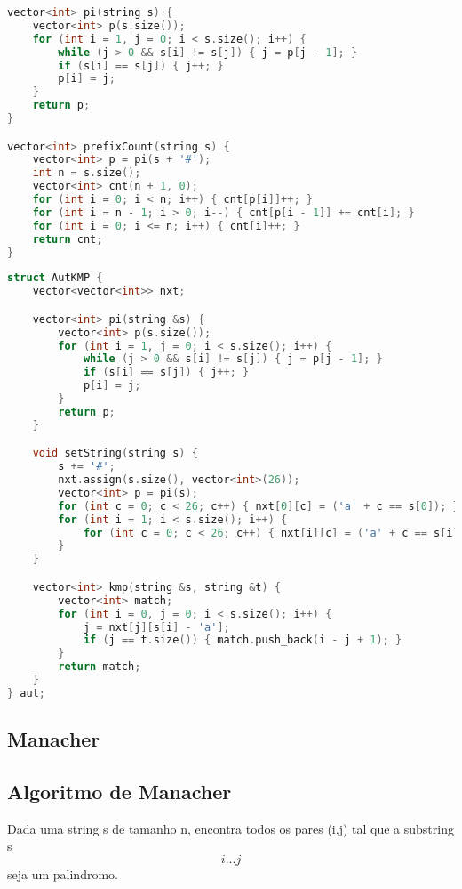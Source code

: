 \documentclass[11pt, a4paper, twoside]{article}
\begin{document}
\begin{lstlisting}[language=C++]
vector<int> pi(string s) {
    vector<int> p(s.size());
    for (int i = 1, j = 0; i < s.size(); i++) {
        while (j > 0 && s[i] != s[j]) { j = p[j - 1]; }
        if (s[i] == s[j]) { j++; }
        p[i] = j;
    }
    return p;
}

vector<int> prefixCount(string s) {
    vector<int> p = pi(s + '#');
    int n = s.size();
    vector<int> cnt(n + 1, 0);
    for (int i = 0; i < n; i++) { cnt[p[i]]++; }
    for (int i = n - 1; i > 0; i--) { cnt[p[i - 1]] += cnt[i]; }
    for (int i = 0; i <= n; i++) { cnt[i]++; }
    return cnt;
}\end{lstlisting}

\begin{lstlisting}[language=C++]
struct AutKMP {
    vector<vector<int>> nxt;

    vector<int> pi(string &s) {
        vector<int> p(s.size());
        for (int i = 1, j = 0; i < s.size(); i++) {
            while (j > 0 && s[i] != s[j]) { j = p[j - 1]; }
            if (s[i] == s[j]) { j++; }
            p[i] = j;
        }
        return p;
    }

    void setString(string s) {
        s += '#';
        nxt.assign(s.size(), vector<int>(26));
        vector<int> p = pi(s);
        for (int c = 0; c < 26; c++) { nxt[0][c] = ('a' + c == s[0]); }
        for (int i = 1; i < s.size(); i++) {
            for (int c = 0; c < 26; c++) { nxt[i][c] = ('a' + c == s[i]) ? i + 1 : nxt[p[i - 1]][c]; }
        }
    }

    vector<int> kmp(string &s, string &t) {
        vector<int> match;
        for (int i = 0, j = 0; i < s.size(); i++) {
            j = nxt[j][s[i] - 'a'];
            if (j == t.size()) { match.push_back(i - j + 1); }
        }
        return match;
    }
} aut;
\end{lstlisting}

\subsection{Manacher}

\subsection{Algoritmo de Manacher}



Dada uma string s de tamanho n, encontra todos os pares (i,j) tal que a substring s\[i...j\] seja um palindromo.
\end{document}

